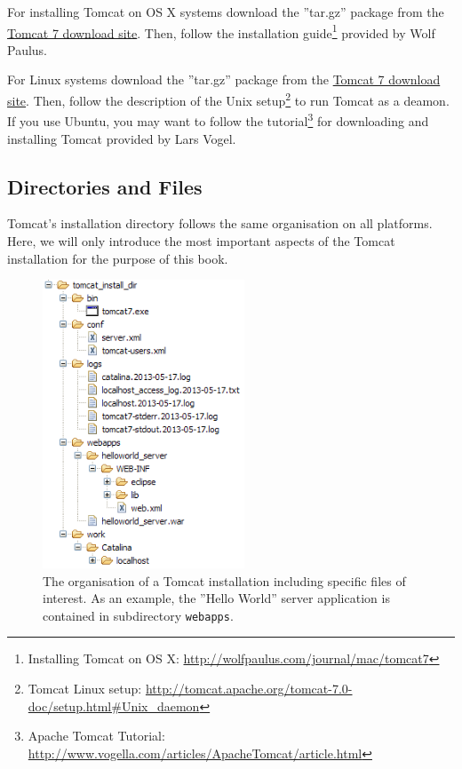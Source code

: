 \documentclass[a4paper,10pt,twoside]{book}
\begin{document}
For installing Tomcat on OS X systems download the ''tar.gz'' package from the \href{http://tomcat.apache.org/download-70.cgi}{Tomcat 7 download site}.
Then, follow the installation guide\footnote{
Installing Tomcat on OS X: \url{http://wolfpaulus.com/journal/mac/tomcat7}
} provided by Wolf Paulus.

For Linux systems download the ''tar.gz'' package from the \href{http://tomcat.apache.org/download-70.cgi}{Tomcat 7 download site}.
Then, follow the description of the Unix setup\footnote{
Tomcat Linux setup: \url{http://tomcat.apache.org/tomcat-7.0-doc/setup.html#Unix_daemon}
}
to run Tomcat as a deamon.
If you use Ubuntu, you may want to follow the tutorial\footnote{
Apache Tomcat Tutorial: \url{http://www.vogella.com/articles/ApacheTomcat/article.html}
} 
for downloading and installing Tomcat provided by Lars Vogel.


\subsection{Directories and Files}

Tomcat's installation directory follows the same organisation on all platforms.
Here, we will only introduce the most important aspects of the Tomcat installation for the purpose of this book.

\begin{figure}
\includegraphics[width=6cm]{tomcat_install_dir.png}
\caption{The organisation of a Tomcat installation including specific files of interest.
As an example, the ''Hello World'' server application is contained in subdirectory \texttt{webapps}.
}
\end{figure}
\end{document}
